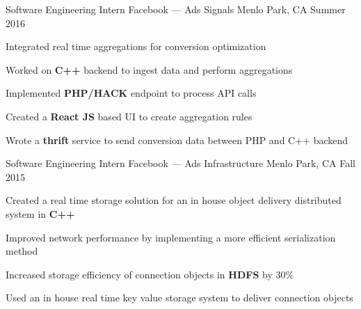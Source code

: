


\begin{cventries}


\cventry
{Software Engineering Intern} %
{{\color{facebookblue}Facebook} --- Ads Signals} %
{Menlo Park, CA} %
{Summer 2016} %
{ %
\begin{cvitems}
\item {Integrated real time aggregations for conversion optimization}
\item {Worked on \textbf{C++} backend to ingest data and perform aggregations}
\item {Implemented \textbf{PHP/HACK} endpoint to process API calls}
\item {Created a \textbf{React JS} based UI to create aggregation rules}
\item {Wrote a \textbf{thrift} service to send conversion data between PHP and C++ backend}
\end{cvitems}
}


\cventry
{Software Engineering Intern} %
{{\color{facebookblue}Facebook} --- Ads Infrastructure} %
{Menlo Park, CA} %
{Fall 2015} %
{ %
\begin{cvitems}
\item {Created a real time storage solution for an in house object delivery distributed system in \textbf{C++}}
\item {Improved network performance by implementing a more efficient serialization method}
\item {Increased storage efficiency of connection objects in \textbf{HDFS} by 30\%}
\item {Used an in house real time key value storage system to deliver connection objects}
\end{cvitems}
}


\end{cventries}
